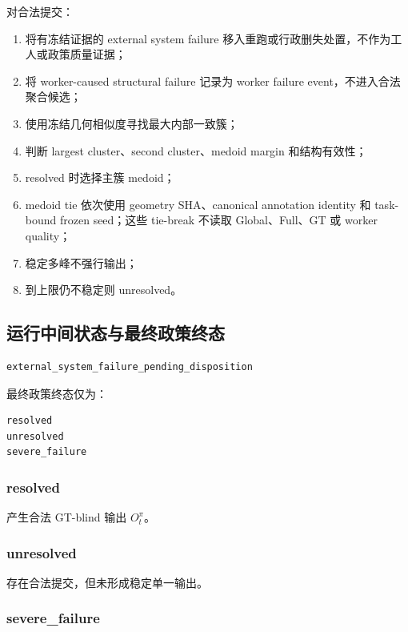 对合法提交：

\begin{enumerate}
  \item 将有冻结证据的 external system failure 移入重跑或行政删失处置，不作为工人或政策质量证据；
  \item 将 worker-caused structural failure 记录为 worker failure event，不进入合法聚合候选；
  \item 使用冻结几何相似度寻找最大内部一致簇；
  \item 判断 largest cluster、second cluster、medoid margin 和结构有效性；
  \item resolved 时选择主簇 medoid；
  \item medoid tie 依次使用 geometry SHA、canonical annotation identity 和
  task-bound frozen seed；这些 tie-break 不读取 Global、Full、GT 或 worker quality；
  \item 稳定多峰不强行输出；
  \item 到上限仍不稳定则 unresolved。
\end{enumerate}

\subsection{运行中间状态与最终政策终态}

\begin{verbatim}
external_system_failure_pending_disposition
\end{verbatim}

最终政策终态仅为：

\begin{verbatim}
resolved
unresolved
severe_failure
\end{verbatim}

\subsubsection{resolved}

产生合法 GT-blind 输出 \(O_t^\pi\)。

\subsubsection{unresolved}

存在合法提交，但未形成稳定单一输出。

\subsubsection{severe\_failure}


